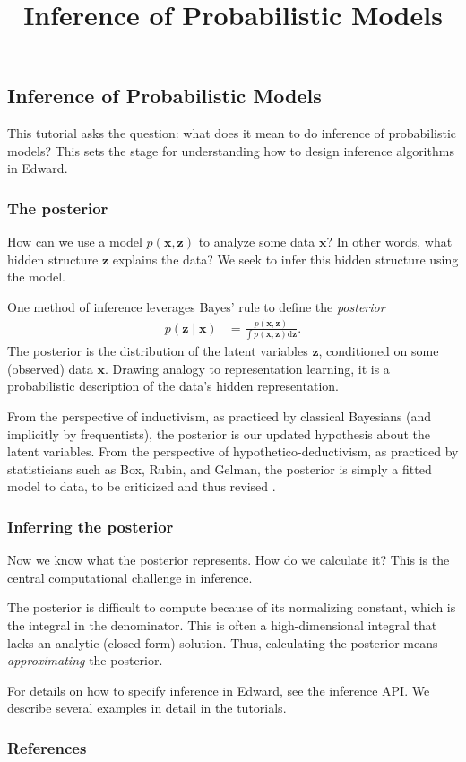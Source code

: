 \title{Inference of Probabilistic Models}

\subsection{Inference of Probabilistic Models}

This tutorial asks the question: what does it mean to do inference of
probabilistic models? This sets the stage for understanding how to
design inference algorithms in Edward.

\subsubsection{The posterior}

How can we use a model $p(\mathbf{x}, \mathbf{z})$ to analyze some
data $\mathbf{x}$? In other words, what hidden structure $\mathbf{z}$
explains the data? We seek to infer this hidden structure using the
model.

One method of inference leverages Bayes' rule to define the
\emph{posterior}
\begin{align*}
  p(\mathbf{z} \mid \mathbf{x})
  &=
  \frac{p(\mathbf{x}, \mathbf{z})}{\int p(\mathbf{x}, \mathbf{z}) \text{d}\mathbf{z}}.
\end{align*}
The posterior is the distribution of the latent variables
$\mathbf{z}$, conditioned on some (observed) data $\mathbf{x}$.
Drawing analogy to representation learning, it is a probabilistic
description of the data's hidden representation.

From the perspective of inductivism, as practiced by classical
Bayesians (and implicitly by frequentists),
the posterior is our updated hypothesis about the latent variables.
From the perspective of hypothetico-deductivism, as practiced by
statisticians such as Box, Rubin, and Gelman, the posterior is simply
a fitted model to data, to be criticized and thus revised
\citep{box1982apology,gelman2013philosophy}.

\subsubsection{Inferring the posterior}

Now we know what the posterior represents. How do we calculate it? This is the
central computational challenge in inference.

The posterior is difficult to compute because of its normalizing
constant, which is the integral in the denominator.
This is often a high-dimensional integral that lacks an analytic (closed-form)
solution. Thus, calculating the posterior means \emph{approximating} the
posterior.

For details on how to specify inference in Edward, see the
\href{/api/inference}{inference API}. We describe several examples in
detail in the \href{/tutorials/}{tutorials}.


\subsubsection{References}\label{references}

